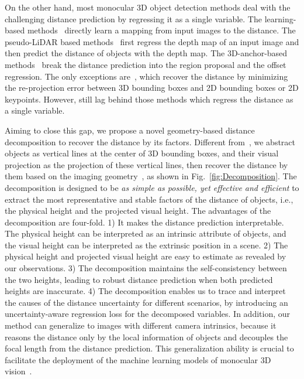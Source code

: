 \documentclass[10pt,twocolumn,letterpaper]{article}
\begin{document}
On the other hand, most monocular 3D object detection methods deal with the challenging distance prediction by regressing it as a single variable. The learning-based methods~\cite{DBLP:journals/corr/abs-1904-07850,DBLP:conf/cvpr/ChenTSL20,DBLP:conf/iccv/SimonelliBPLK19,DBLP:conf/eccv/SimonelliBPRK20} directly learn a mapping from input images to the distance. The pseudo-LiDAR based methods~\cite{DBLP:conf/cvpr/WangCGHCW19,DBLP:conf/iccv/MaWLZOF19,DBLP:conf/eccv/YeDSLTFDW20} first regress the depth map of an input image and then predict the distance of objects with the depth map. The 3D-anchor-based methods~\cite{DBLP:conf/iccv/Brazil019,DBLP:conf/eccv/BrazilPLS20,DBLP:conf/cvpr/DingHYWSLL20a} break the distance prediction into the region proposal and the offset regression. The only exceptions are~\cite{DBLP:conf/cvpr/MousavianAFK17,DBLP:journals/corr/abs-1906-08070,DBLP:conf/eccv/LiZLC20}, which recover the distance by minimizing the re-projection error between 3D bounding boxes and 2D bounding boxes or 2D keypoints. 
However, \cite{DBLP:conf/cvpr/MousavianAFK17,DBLP:journals/corr/abs-1906-08070,DBLP:conf/eccv/LiZLC20} still lag behind those methods which regress the distance as a single variable.

Aiming to close this gap, we propose a novel geometry-based distance decomposition to recover the distance by its factors. Different from~\cite{DBLP:conf/cvpr/MousavianAFK17,DBLP:journals/corr/abs-1906-08070,DBLP:conf/eccv/LiZLC20}, we abstract objects as vertical lines at the center of 3D bounding boxes, and their visual projection as the projection of these vertical lines, then recover the distance by them based on the imaging geometry~\cite{Hartley2000}, as shown in Fig.~\ref{fig:Decomposition}. The decomposition is designed to be \textit{as simple as possible, yet effective and efficient} to extract the most representative and stable factors of the distance of objects, i.e., the physical height and the projected visual height. The advantages of the decomposition are four-fold. 1) It makes the distance prediction interpretable. The physical height can be interpreted as an intrinsic attribute of objects, and the visual height can be interpreted as the extrinsic position in a scene. 2) The physical height and projected visual height are easy to estimate as revealed by our observations. 3) The decomposition maintains the self-consistency between the two heights, leading to robust distance prediction when both predicted heights are inaccurate. 4) The decomposition enables us to trace and interpret the causes of the distance uncertainty for different scenarios, by introducing an uncertainty-aware regression loss for the decomposed variables. In addition, our method can generalize to images with different camera intrinsics, because it reasons the distance only by the local information of objects and decouples the focal length from the distance prediction. This generalization ability is crucial to facilitate the deployment of the machine learning models of monocular 3D vision~\cite{DBLP:conf/cvpr/FacilUZMBC19}.
\end{document}
